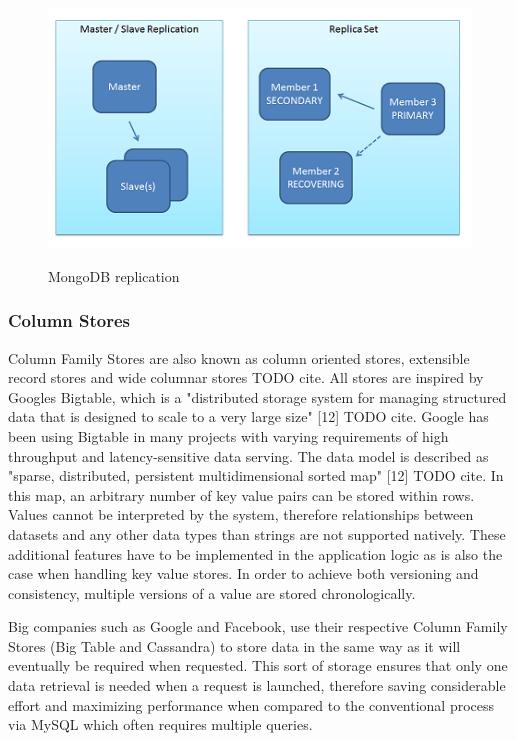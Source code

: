 \begin{figure}[htb]
  \centering
  \includegraphics{mongodb_repl.png}\\
  \caption{MongoDB replication}
  \label{fig:mongodb_repl}
\end{figure}

\subsubsection{Column Stores}
Column Family Stores are also known as column oriented stores, extensible record stores and wide columnar stores TODO cite. All stores are inspired by Googles Bigtable, which is a "distributed storage system for managing structured data that is designed to scale to a very large size" [12] TODO cite. Google has been using Bigtable in many projects with varying requirements of high throughput and latency-sensitive data serving. The data model is described as "sparse, distributed, persistent multidimensional sorted map" [12] TODO cite. In this map, an arbitrary number of key value pairs can be stored within rows. Values cannot be interpreted by the system, therefore relationships between datasets and any other data types than strings are not supported natively. These additional features have to be implemented in the application logic as is also the case when handling key value stores. In order to achieve both versioning and consistency, multiple versions of a value are stored chronologically. 

Big companies such as Google and Facebook, use their respective Column Family Stores (Big Table and Cassandra) to store data in the same way as it will eventually be required when requested. This sort of storage  ensures that only one data retrieval is needed when a request is launched, therefore saving considerable effort and maximizing performance when compared to the conventional process via MySQL which often requires multiple queries.  

